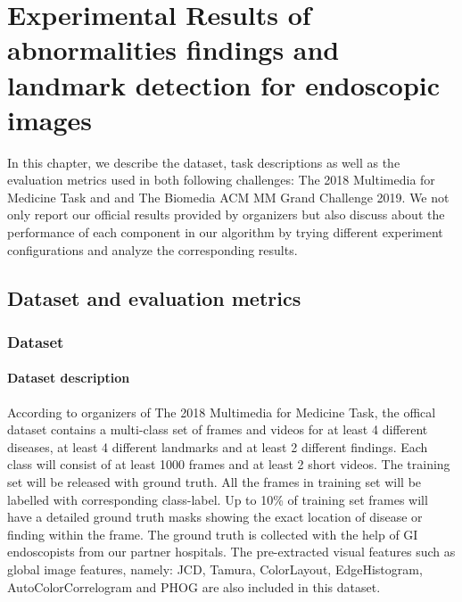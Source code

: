 \chapter{Experimental Results of abnormalities findings and landmark detection for endoscopic images}
\label{chap-experiment-endoscopy} 
\begin{ChapAbstract}
In this chapter, we describe the dataset, task descriptions as well as the evaluation metrics used in both following challenges: The 2018 Multimedia for Medicine Task and and The Biomedia ACM MM Grand Challenge 2019. We not only report our official results provided by organizers but also discuss about the performance of each component in our algorithm by trying different experiment configurations and analyze the corresponding results.
\end{ChapAbstract}

\section{Dataset and evaluation metrics}
\label{dataset_evaluation_endoscopy}
\subsection{Dataset}
\subsubsection*{Dataset description}
According to organizers of The 2018 Multimedia for Medicine Task, the offical dataset contains a multi-class set of frames and videos for at least 4 different diseases, at least 4 different landmarks and at least 2 different findings. Each class will consist of at least 1000 frames and at least 2 short videos. The training set will be released with ground truth. All the frames in training set will be labelled with corresponding class-label. Up to 10\% of training set frames will have a detailed ground truth masks showing the exact location of disease or finding within the frame. The ground truth is collected with the help of GI endoscopists from our partner hospitals. The pre-extracted visual features such as global image features, namely: JCD, Tamura, ColorLayout, EdgeHistogram, AutoColorCorrelogram and PHOG are also included in this dataset.


